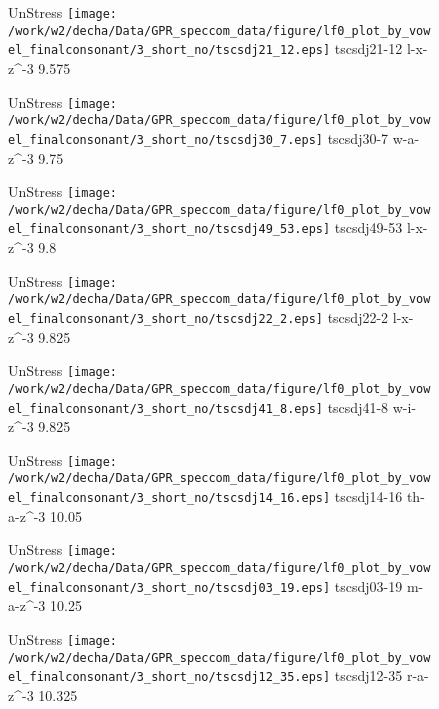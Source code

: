 \documentclass{article}
\begin{document}
\begin{figure}[t]
\begin{minipage}[b]{.24\textwidth}
UnStress
\centering
\texttt{[image: /work/w2/decha/Data/GPR\_speccom\_data/figure/lf0\_plot\_by\_vowel\_finalconsonant/3\_short\_no/tscsdj21\_12.eps]}
tscsdj21-12 l-x-z\textasciicircum-3 9.575
\end{minipage}
\begin{minipage}[b]{.24\textwidth}
UnStress
\centering
\texttt{[image: /work/w2/decha/Data/GPR\_speccom\_data/figure/lf0\_plot\_by\_vowel\_finalconsonant/3\_short\_no/tscsdj30\_7.eps]}
tscsdj30-7 w-a-z\textasciicircum-3 9.75
\end{minipage}
\begin{minipage}[b]{.24\textwidth}
UnStress
\centering
\texttt{[image: /work/w2/decha/Data/GPR\_speccom\_data/figure/lf0\_plot\_by\_vowel\_finalconsonant/3\_short\_no/tscsdj49\_53.eps]}
tscsdj49-53 l-x-z\textasciicircum-3 9.8
\end{minipage}
\begin{minipage}[b]{.24\textwidth}
UnStress
\centering
\texttt{[image: /work/w2/decha/Data/GPR\_speccom\_data/figure/lf0\_plot\_by\_vowel\_finalconsonant/3\_short\_no/tscsdj22\_2.eps]}
tscsdj22-2 l-x-z\textasciicircum-3 9.825
\end{minipage}
\end{figure}

\begin{figure}[t]
\begin{minipage}[b]{.24\textwidth}
UnStress
\centering
\texttt{[image: /work/w2/decha/Data/GPR\_speccom\_data/figure/lf0\_plot\_by\_vowel\_finalconsonant/3\_short\_no/tscsdj41\_8.eps]}
tscsdj41-8 w-i-z\textasciicircum-3 9.825
\end{minipage}
\begin{minipage}[b]{.24\textwidth}
UnStress
\centering
\texttt{[image: /work/w2/decha/Data/GPR\_speccom\_data/figure/lf0\_plot\_by\_vowel\_finalconsonant/3\_short\_no/tscsdj14\_16.eps]}
tscsdj14-16 th-a-z\textasciicircum-3 10.05
\end{minipage}
\begin{minipage}[b]{.24\textwidth}
UnStress
\centering
\texttt{[image: /work/w2/decha/Data/GPR\_speccom\_data/figure/lf0\_plot\_by\_vowel\_finalconsonant/3\_short\_no/tscsdj03\_19.eps]}
tscsdj03-19 m-a-z\textasciicircum-3 10.25
\end{minipage}
\begin{minipage}[b]{.24\textwidth}
UnStress
\centering
\texttt{[image: /work/w2/decha/Data/GPR\_speccom\_data/figure/lf0\_plot\_by\_vowel\_finalconsonant/3\_short\_no/tscsdj12\_35.eps]}
tscsdj12-35 r-a-z\textasciicircum-3 10.325
\end{minipage}
\end{figure}
\end{document}

